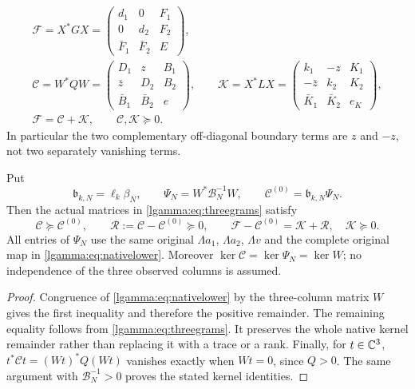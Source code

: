 \documentclass[11pt]{article}
\begin{document}
\begin{equation}\label{lgamma:eq:threegrams}
 \begin{gathered}
 \mathcal F=X^*GX=
 \begin{pmatrix}d_1&0&F_1\\0&d_2&F_2\\\bar F_1&\bar F_2&E\end{pmatrix},\\
 \mathcal C=W^*QW=
 \begin{pmatrix}D_1&z&B_1\\\bar z&D_2&B_2\\\bar B_1&\bar B_2&e\end{pmatrix},\qquad
 \mathcal K=X^*LX=
 \begin{pmatrix}k_1&-z&K_1\\-\bar z&k_2&K_2\\\bar K_1&\bar K_2&e_K\end{pmatrix},\\
 \mathcal F=\mathcal C+\mathcal K,\qquad \mathcal C,\mathcal K\succeq0.
 \end{gathered}
\end{equation}
In particular the two complementary off-diagonal boundary terms are
$z$ and $-z$, not two separately vanishing terms.

\begin{lgammatheorem}\label{lgamma:thm:joint}
Put
\begin{equation}\label{lgamma:eq:baseline}
 \mathfrak b_{k,N}=\ell_k\beta_N,\qquad
 \Psi_N=W^*\mathcal B_N^{-1}W,\qquad
 \mathcal C^{(0)}=\mathfrak b_{k,N}\Psi_N.
\end{equation}
Then the actual matrices in \eqref{lgamma:eq:threegrams} satisfy
\begin{equation}\label{lgamma:eq:joint}
 \boxed{\mathcal C\succeq\mathcal C^{(0)},\qquad
 \mathcal R:=\mathcal C-\mathcal C^{(0)}\succeq0,\qquad
 \mathcal F-\mathcal C^{(0)}=\mathcal K+\mathcal R,\quad
 \mathcal K\succeq0.}
\end{equation}
All entries of $\Psi_N$ use the same original $\Lambda a_1$,
$\Lambda a_2$, $\Lambda v$ and the complete original map in
\eqref{lgamma:eq:nativelower}.
Moreover $\ker\mathcal C=\ker\Psi_N=\ker W$; no independence of
the three observed columns is assumed.
\end{lgammatheorem}
\begin{proof}
Congruence of \eqref{lgamma:eq:nativelower} by the three-column matrix $W$
gives the first inequality and therefore the positive remainder.
The remaining equality follows from \eqref{lgamma:eq:threegrams}.  It
preserves the whole native kernel remainder rather than replacing it
with a trace or a rank.
Finally, for $t\in\mathbb C^3$, $t^*\mathcal Ct=(Wt)^*Q(Wt)$ vanishes
exactly when $Wt=0$, since $Q>0$.  The same argument with
$\mathcal B_N^{-1}>0$ proves the stated kernel identities.
\end{proof}
\end{document}
